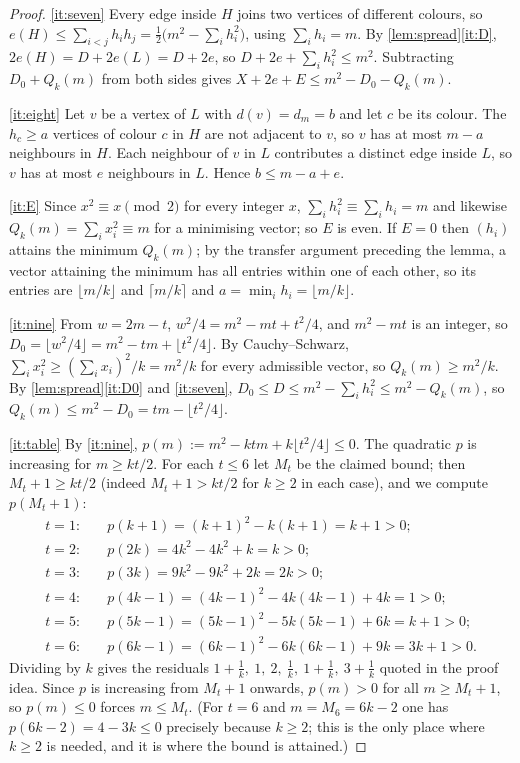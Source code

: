 \documentclass[11pt,a4paper]{article}
\theoremstyle{plain}
\theoremstyle{definition}
\theoremstyle{remark}
\newcommand{\fl}[1]{\lfloor #1\rfloor}
\newcommand{\ce}[1]{\lceil #1\rceil}
\begin{document}
\label{pf:col}
\lemcol*
\begin{proof}
\ref{it:seven} Every edge inside $H$ joins two vertices of different colours, so $e(H)\le\sum_{i<j}h_ih_j=\tfrac12\bigl(m^2-\sum_ih_i^2\bigr)$, using $\sum_ih_i=m$. By \cref{lem:spread}\ref{it:D}, $2e(H)=D+2e(L)=D+2e$, so $D+2e+\sum_ih_i^2\le m^2$. Subtracting $D_0+Q_k(m)$ from both sides gives $X+2e+E\le m^2-D_0-Q_k(m)$.

\ref{it:eight} Let $v$ be a vertex of $L$ with $d(v)=d_m=b$ and let $c$ be its colour. The $h_c\ge a$ vertices of colour $c$ in $H$ are not adjacent to $v$, so $v$ has at most $m-a$ neighbours in $H$. Each neighbour of $v$ in $L$ contributes a distinct edge inside $L$, so $v$ has at most $e$ neighbours in $L$. Hence $b\le m-a+e$.

\ref{it:E} Since $x^2\equiv x\pmod2$ for every integer $x$, $\sum_ih_i^2\equiv\sum_ih_i=m$ and likewise $Q_k(m)=\sum_ix_i^2\equiv m$ for a minimising vector; so $E$ is even. If $E=0$ then $(h_i)$ attains the minimum $Q_k(m)$; by the transfer argument preceding the lemma, a vector attaining the minimum has all entries within one of each other, so its entries are $\fl{m/k}$ and $\ce{m/k}$ and $a=\min_ih_i=\fl{m/k}$.

\ref{it:nine} From $w=2m-t$, $w^2/4=m^2-mt+t^2/4$, and $m^2-mt$ is an integer, so $D_0=\fl{w^2/4}=m^2-tm+\fl{t^2/4}$. By Cauchy--Schwarz, $\sum_ix_i^2\ge(\sum_ix_i)^2/k=m^2/k$ for every admissible vector, so $Q_k(m)\ge m^2/k$. By \cref{lem:spread}\ref{it:D0} and \ref{it:seven}, $D_0\le D\le m^2-\sum_ih_i^2\le m^2-Q_k(m)$, so $Q_k(m)\le m^2-D_0=tm-\fl{t^2/4}$.

\ref{it:table} By \ref{it:nine}, $p(m):=m^2-ktm+k\fl{t^2/4}\le0$. The quadratic $p$ is increasing for $m\ge kt/2$. For each $t\le6$ let $M_t$ be the claimed bound; then $M_t+1\ge kt/2$ (indeed $M_t+1>kt/2$ for $k\ge2$ in each case), and we compute $p(M_t+1)$:
\begin{align*}
t=1:\quad &p(k+1)=(k+1)^2-k(k+1)=k+1>0;\\
t=2:\quad &p(2k)=4k^2-4k^2+k=k>0;\\
t=3:\quad &p(3k)=9k^2-9k^2+2k=2k>0;\\
t=4:\quad &p(4k-1)=(4k-1)^2-4k(4k-1)+4k=1>0;\\
t=5:\quad &p(5k-1)=(5k-1)^2-5k(5k-1)+6k=k+1>0;\\
t=6:\quad &p(6k-1)=(6k-1)^2-6k(6k-1)+9k=3k+1>0.
\end{align*}
Dividing by $k$ gives the residuals $1+\frac1k,\ 1,\ 2,\ \frac1k,\ 1+\frac1k,\ 3+\frac1k$ quoted in the proof idea. Since $p$ is increasing from $M_t+1$ onwards, $p(m)>0$ for all $m\ge M_t+1$, so $p(m)\le0$ forces $m\le M_t$. (For $t=6$ and $m=M_6=6k-2$ one has $p(6k-2)=4-3k\le0$ precisely because $k\ge2$; this is the only place where $k\ge2$ is needed, and it is where the bound is attained.)
\end{proof}
\end{document}
